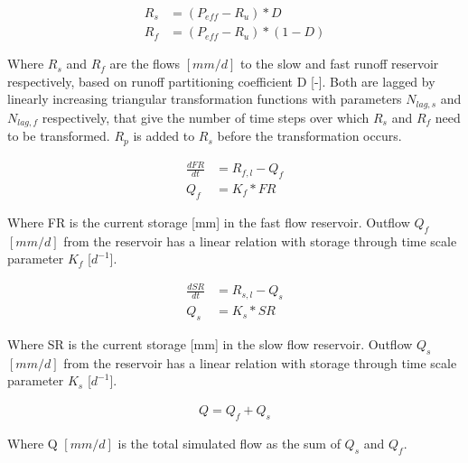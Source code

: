\begin{align}
	R_s &= (P_{eff} - R_u)*D\\
	R_f &= (P_{eff} - R_u)*(1-D)
\end{align}

Where $R_s$ and $R_f$ are the flows $[mm/d]$ to the slow and fast runoff reservoir respectively, based on runoff partitioning coefficient D [-]. Both are lagged by linearly increasing triangular transformation functions with parameters $N_{lag,s}$ and $N_{lag,f}$ respectively, that give the number of time steps over which $R_s$ and $R_f$ need to be transformed. $R_p$ is added to $R_s$ before the transformation occurs.

\begin{align}
	\frac{dFR}{dt} &= R_{f,l} - Q_f\\
	Q_f &= K_f * FR 
\end{align}

Where FR is the current storage [mm] in the fast flow reservoir. Outflow $Q_f$ $[mm/d]$ from the reservoir has a linear relation with storage through time scale parameter $K_f$ [$d^{-1}$]. 

\begin{align}
	\frac{dSR}{dt} &= R_{s,l} - Q_s \\
	Q_s &= K_s * SR 
\end{align}

Where SR is the current storage [mm] in the slow flow reservoir. Outflow $Q_s$ $[mm/d]$ from the reservoir has a linear relation with storage through time scale parameter $K_s$ [$d^{-1}$]. 

\begin{align}
	Q = Q_f + Q_s
\end{align}

Where Q $[mm/d]$  is the total simulated flow as the sum of $Q_s$ and $Q_f$.

